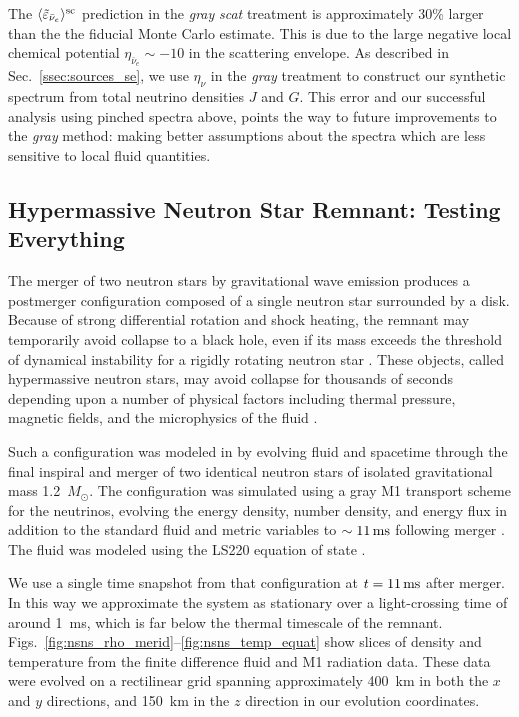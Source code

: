\documentclass[aps,floatfix,prd,superscriptaddress,twocolumn]{revtex4-1}
\begin{document}
The $\langle\tilde{\varepsilon}_{\bar{\nu}_e}\rangle^{\rm sc}$ prediction
in the \emph{gray} \emph{scat} treatment is approximately 30\%
larger than the the fiducial Monte Carlo estimate. This is
due to the large negative local chemical potential
$\eta_{\bar{\nu}_e}\sim-10$ in the scattering envelope.
As described in Sec.~\ref{ssec:sources_se},
we use $\eta_\nu$ in the \emph{gray} treatment to construct our
synthetic spectrum from total neutrino densities $J$ and $G$.
This error and our successful analysis using pinched spectra above,
points the way to future improvements to the \emph{gray} method:
making better assumptions about the spectra which are less sensitive
to local fluid quantities.

\subsection{Hypermassive Neutron Star Remnant:
  Testing Everything}
\label{ssec:test_disk_comparison}
The merger of two neutron stars by gravitational wave emission produces a
postmerger configuration composed of a single neutron star surrounded by a disk.
Because of strong differential rotation and shock heating,
the remnant may temporarily avoid collapse to a black hole,
even if its mass exceeds the threshold of dynamical
instability for a rigidly rotating neutron star \cite{duez2009-review}.
These objects, called hypermassive neutron stars,
may avoid collapse for thousands of seconds
depending upon a number of physical factors including thermal pressure,
magnetic fields, and the microphysics of the fluid
\cite{rezz2015-two_winds,ravi2014-hmns_collapse}.

Such a configuration was modeled in \cite{fouc2016-m1_nsns} by
evolving fluid and spacetime through the
final inspiral and merger of two identical neutron stars of
isolated gravitational mass 1.2~$M_{\odot}$. The configuration
was simulated using a gray M1 transport scheme for the neutrinos, evolving the
energy density, number density, and energy flux in addition to the standard
fluid and metric variables to $\sim11\,{\rm ms}$ following merger
\cite{fouc2016-m1_evolve_n}.
The fluid was modeled using the LS220 equation of state \cite{latt1991-nuc_eos}.

We use a single time snapshot from that configuration
at $t=11\,{\rm ms}$ after merger.
In this way we approximate the system as stationary over a light-crossing time
of around 1~ms, which is far below the thermal timescale of the remnant.
Figs.~\ref{fig:nsns_rho_merid}--\ref{fig:nsns_temp_equat}
show slices of density and temperature from the finite difference
fluid and M1 radiation data.
These data were evolved on a rectilinear grid spanning approximately 400~km in
both the $x$ and $y$ directions, and 150~km in the $z$ direction in our
evolution coordinates.
\end{document}
